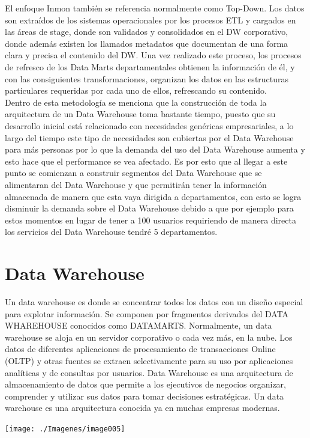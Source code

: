 El enfoque Inmon también se referencia normalmente como Top-Down. Los datos son extraídos de los sistemas operacionales por los procesos ETL y cargados en las áreas de stage, donde son validados y consolidados en el DW corporativo, donde además existen los llamados metadatos que documentan de una forma clara y precisa el contenido del DW. Una vez realizado este proceso, los procesos de refresco de los Data Marts departamentales obtienen la información de él, y con las consiguientes transformaciones, organizan los datos en las estructuras particulares requeridas por cada uno de ellos, refrescando su contenido.\\
Dentro de esta metodología se menciona que la construcción de toda la arquitectura de un Data Warehouse toma bastante tiempo, puesto que su desarrollo inicial está relacionado con necesidades genéricas empresariales, a lo largo del tiempo este tipo de necesidades son cubiertas por el Data Warehouse para más personas por lo que la demanda del uso del Data Warehouse aumenta y esto hace que el performance se vea afectado. Es por esto que al llegar a este punto se comienzan a construir segmentos del Data Warehouse que se alimentaran del Data Warehouse y que permitirán tener la información almacenada de manera que esta vaya dirigida a departamentos, con esto se logra disminuir la demanda sobre el Data Warehouse debido a que por ejemplo para estos momentos en lugar de tener a 100 usuarios requiriendo de manera directa los servicios del Data Warehouse tendré 5 departamentos.

\section{Data Warehouse}
Un data warehouse es donde se concentrar todos los datos con un diseño especial para explotar información. Se componen por fragmentos derivados del DATA WHAREHOUSE conocidos como DATAMARTS.
Normalmente, un data warehouse se aloja en un servidor corporativo o cada vez más, en la nube. Los datos de diferentes aplicaciones de procesamiento de transacciones Online (OLTP) y otras fuentes se extraen selectivamente para su uso por aplicaciones analíticas y de consultas por usuarios.
Data Warehouse es una arquitectura de almacenamiento de datos que permite a los ejecutivos de negocios organizar, comprender y utilizar sus datos para tomar decisiones estratégicas. Un data warehouse es una arquitectura conocida ya en muchas empresas modernas.
 
 \begin{center}
\texttt{[image: ./Imagenes/image005]}
\end{center}


